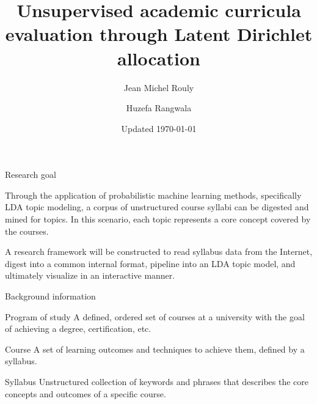 \documentclass{beamer}
\title[Curricula and LDA]{Unsupervised academic curricula evaluation
  through Latent Dirichlet allocation}
\author{Jean Michel Rouly \and Huzefa Rangwala}
\date{Updated \today}
\begin{document}
  \frame{\titlepage}

  \begin{frame}{Research goal}

    \vfill

    Through the application of probabilistic machine learning methods,
    specifically LDA topic modeling, a corpus of unstructured course
    syllabi can be digested and mined for topics. In this scenario, each
    topic represents a core concept covered by the courses.

    \vfill

    A research framework will be constructed to read syllabus data from the
    Internet, digest into a common internal format, pipeline into an LDA
    topic model, and ultimately visualize in an interactive manner.

    \vfill

  \end{frame}

  \begin{frame}{Background information}

    \onslide<+->
    \begin{block}{Program of study}
      A defined, ordered set of courses at a university with the goal of
      achieving a degree, certification, etc.
    \end{block}

    \onslide<+->
    \begin{block}{Course}
      A set of learning outcomes and techniques to achieve them, defined by
      a syllabus.
    \end{block}

    \onslide<+->
    \begin{block}{Syllabus}
      Unstructured collection of keywords and phrases that describes the
      core concepts and outcomes of a specific course.
    \end{block}

  \end{frame}
\end{document}
